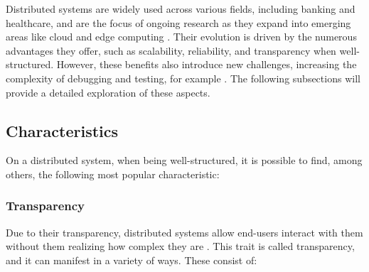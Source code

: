 Distributed systems are widely used across various fields, including banking and healthcare, and are the focus of ongoing research as they expand into emerging areas like cloud and edge computing \cite{Brendan2018, Coulouris2012, Lindsay2021}. Their evolution is driven by the numerous advantages they offer, such as scalability, reliability, and transparency when well-structured. However, these benefits also introduce new challenges, increasing the complexity of debugging and testing, for example \cite{Brendan2018}. The following subsections will provide a detailed exploration of these aspects.

\subsection{Characteristics}

On a distributed system, when being well-structured, it is possible to find, among others, the following most popular characteristic:

\subsubsection{Transparency}

Due to their transparency, distributed systems allow end-users interact with them without them realizing how complex they are \cite{Tanenbaum2023, Ledmi2018}. This trait is called transparency, and it can manifest in a variety of ways. These consist of:

